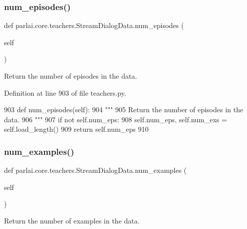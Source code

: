 \subsubsection{\texorpdfstring{num\+\_\+episodes()}{num\_episodes()}}
{\footnotesize\ttfamily def parlai.\+core.\+teachers.\+Stream\+Dialog\+Data.\+num\+\_\+episodes (\begin{DoxyParamCaption}\item[{}]{self }\end{DoxyParamCaption})}

\begin{DoxyVerb}Return the number of episodes in the data.
\end{DoxyVerb}
 

Definition at line 903 of file teachers.\+py.


\begin{DoxyCode}
903     \textcolor{keyword}{def }num\_episodes(self):
904         \textcolor{stringliteral}{"""}
905 \textcolor{stringliteral}{        Return the number of episodes in the data.}
906 \textcolor{stringliteral}{        """}
907         \textcolor{keywordflow}{if} \textcolor{keywordflow}{not} self.num\_eps:
908             self.num\_eps, self.num\_exs = self.load\_length()
909         \textcolor{keywordflow}{return} self.num\_eps
910 
\end{DoxyCode}
\mbox{\label{classparlai_1_1core_1_1teachers_1_1StreamDialogData_ada385b7a8f549f4d65eb910b668c77e5}} 
\subsubsection{\texorpdfstring{num\+\_\+examples()}{num\_examples()}}
{\footnotesize\ttfamily def parlai.\+core.\+teachers.\+Stream\+Dialog\+Data.\+num\+\_\+examples (\begin{DoxyParamCaption}\item[{}]{self }\end{DoxyParamCaption})}

\begin{DoxyVerb}Return the number of examples in the data.
\end{DoxyVerb}
 


